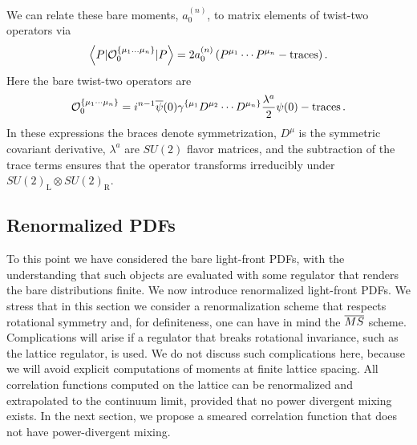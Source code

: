 We can relate these bare moments, $a_{0}^{(n)}$, to matrix elements of 
twist-two operators via
\begin{equation}\label{eq:opePDF}
\left\langle P | {\cal O}_{0}^{\{\mu_1\ldots \mu_n\}} | P 
\right\rangle = 2a_{0}^{(n)} \left(P^{\mu_1}\cdots P^{\mu_n} - 
\mathrm{traces}\right).
\end{equation}
Here the bare
twist-two operators are 
\begin{equation}\label{eq:baretwist2def}
{\cal 
O}_0^{\{\mu_1\cdots \mu_n\}} = i^{n-1}\overline{\psi}(0)
\gamma^{\{\mu_1}D^{\mu_2}\cdots 
D^{\mu_n\}}\frac{\lambda^a}{2}\psi(0)-\operatorname{traces}.
\end{equation}
In these expressions the braces denote symmetrization, $D^\mu$ is the 
symmetric covariant 
derivative, $\lambda^a$ are $SU(2)$ flavor matrices, and the subtraction of the 
trace terms ensures that the operator 
transforms irreducibly under $SU(2)_{\mathrm{L}}\otimes SU(2)_{\mathrm{R}}$. 

\subsection{Renormalized PDFs}

To this point we have considered the bare light-front PDFs, with the 
understanding that such objects are evaluated with some regulator that renders 
the bare distributions finite. We now introduce
renormalized  light-front PDFs. We stress that in this section we 
consider a renormalization scheme that respects rotational symmetry and, for 
definiteness, one can have in mind the $\overline{MS}$ scheme.  Complications will arise 
if  a regulator that breaks rotational invariance, such as 
the lattice regulator, is used. We do not discuss such complications here, 
because we will avoid explicit computations of moments 
at finite lattice spacing. All correlation functions computed on the lattice 
can be renormalized and extrapolated to the continuum limit, provided that  
no power divergent mixing exists. In the next section, we propose a smeared 
correlation function that does not have power-divergent mixing.

